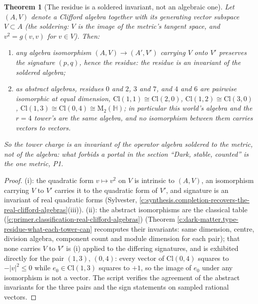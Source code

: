 \documentclass[11pt]{article}
\newtheorem{theorem}{Theorem}[section]
\theoremstyle{definition}
\theoremstyle{plain}
\newcommand{\changedmark}[2]{\marginpar{\raggedright\scriptsize\color{#1}#2}}
\providecommand{\Cl}{}\renewcommand{\Cl}{\mathrm{Cl}}
\providecommand{\HH}{}\renewcommand{\HH}{\mathbb{H}}
\providecommand{\Mat}{}\renewcommand{\Mat}{\mathrm{M}}
\begin{document}
\begin{theorem}[The residue is a soldered invariant, not an algebraic one]\label{c:dark-matter.residue-soldered-invariant-not-algebraic-one}
\changedmark{BurntOrange}{changed since the deposit}
Let $(A, V)$ denote a Clifford algebra together with its generating vector subspace $V \subset A$ (the soldering: $V$ is the image of the metric's tangent space, and $v^{2} = g(v,v)$ for $v \in V$). Then:
\begin{enumerate}
\item[(i)] any algebra isomorphism $(A, V) \to (A', V')$ carrying $V$ onto $V'$ preserves the signature $(p,q)$, hence the residue: the residue is an invariant of the soldered algebra;
\item[(ii)] as abstract algebras, residues $0$ and $2$, $3$ and $7$, and $4$ and $6$ are pairwise isomorphic at equal dimension, $\Cl(1,1) \cong \Cl(2,0)$, $\Cl(1,2) \cong \Cl(3,0)$, $\Cl(1,3) \cong \Cl(0,4) \cong \Mat_2(\HH)$; in particular this world's algebra and the $r = 4$ tower's are the same algebra, and no isomorphism between them carries vectors to vectors.
\end{enumerate}
So the tower charge is an invariant of the operator algebra soldered to the metric, not of the algebra: what forbids a portal in the section ``Dark, stable, counted'' is the one metric, P1.
\end{theorem}
\begin{proof}
(i): the quadratic form $v \mapsto v^{2}$ on $V$ is intrinsic to $(A, V)$, an isomorphism carrying $V$ to $V'$ carries it to the quadratic form of $V'$, and signature is an invariant of real quadratic forms (Sylvester, \ref{c:synthesis.completion-recovers-the-real-clifford-algebras}(iii)). (ii): the abstract isomorphisms are the classical table (\ref{c:primer.classification-real-clifford-algebras}) (Theorem \ref{c:dark-matter.type-residue-what-each-tower-can} recomputes their invariants: same dimension, centre, division algebra, component count and module dimension for each pair); that none carries $V$ to $V'$ is (i) applied to the differing signatures, and is exhibited directly for the pair $(1,3)$, $(0,4)$: every vector of $\Cl(0,4)$ squares to $-|v|^{2} \leq 0$ while $e_{0} \in \Cl(1,3)$ squares to $+1$, so the image of $e_{0}$ under any isomorphism is not a vector. The script verifies the agreement of the abstract invariants for the three pairs and the sign statements on sampled rational vectors.

\end{proof}
\end{document}
